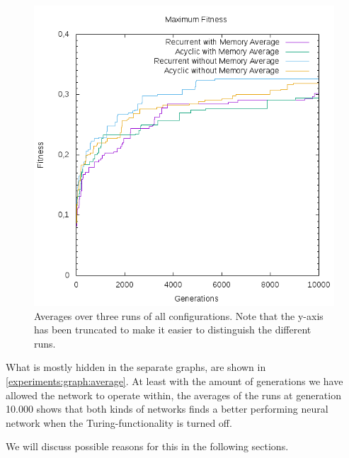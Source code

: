 \begin{figure}[ht]
	\includegraphics[width=\textwidth]{figures/averages.png}
	\caption{Averages over three runs of all configurations. Note that the y-axis has been truncated to make it easier to distinguish the different runs.}
	\label{experiments:graph:average}
\end{figure}

\newpar What is mostly hidden in the separate graphs, are shown in \autoref{experiments:graph:average}. At least with the amount of generations we have allowed the network to operate within, the averages of the runs at generation 10.000 shows that both kinds of networks finds a better performing neural network when the Turing-functionality is turned off.

\newpar We will discuss possible reasons for this in the following sections.
\clearpage